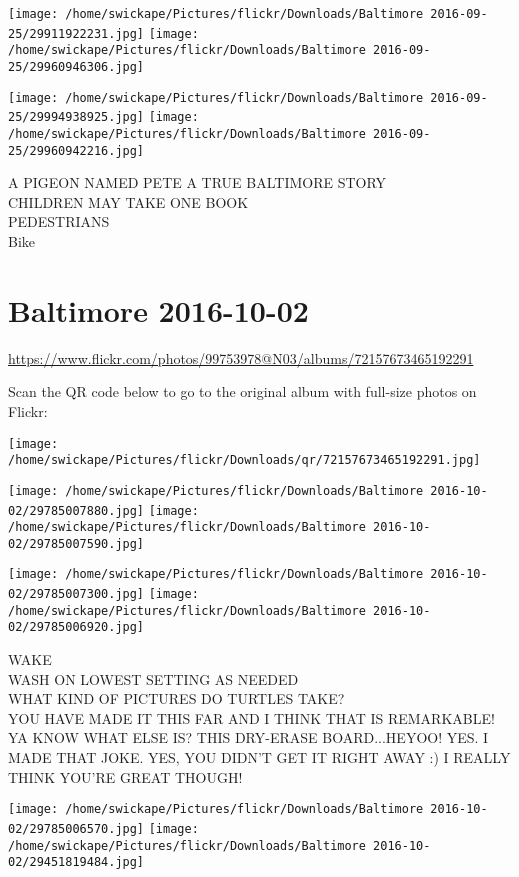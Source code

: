 \documentclass[10pt,letterpaper]{article}
\begin{document}
\texttt{[image: /home/swickape/Pictures/flickr/Downloads/Baltimore 2016-09-25/29911922231.jpg]}
\texttt{[image: /home/swickape/Pictures/flickr/Downloads/Baltimore 2016-09-25/29960946306.jpg]}

\texttt{[image: /home/swickape/Pictures/flickr/Downloads/Baltimore 2016-09-25/29994938925.jpg]}
\texttt{[image: /home/swickape/Pictures/flickr/Downloads/Baltimore 2016-09-25/29960942216.jpg]}

A PIGEON NAMED PETE A TRUE BALTIMORE STORY\\
CHILDREN MAY TAKE ONE BOOK\\
PEDESTRIANS\\
Bike
\pagebreak

\section*{Baltimore 2016-10-02}

\url{https://www.flickr.com/photos/99753978@N03/albums/72157673465192291}

Scan the QR code below to go to the original album with full-size photos on Flickr:

\texttt{[image: /home/swickape/Pictures/flickr/Downloads/qr/72157673465192291.jpg]}
\pagebreak

\texttt{[image: /home/swickape/Pictures/flickr/Downloads/Baltimore 2016-10-02/29785007880.jpg]}
\texttt{[image: /home/swickape/Pictures/flickr/Downloads/Baltimore 2016-10-02/29785007590.jpg]}

\texttt{[image: /home/swickape/Pictures/flickr/Downloads/Baltimore 2016-10-02/29785007300.jpg]}
\texttt{[image: /home/swickape/Pictures/flickr/Downloads/Baltimore 2016-10-02/29785006920.jpg]}

WAKE\\
WASH ON LOWEST SETTING AS NEEDED\\
WHAT KIND OF PICTURES DO TURTLES TAKE?\\
YOU HAVE MADE IT THIS FAR AND I THINK THAT IS REMARKABLE!  YA KNOW WHAT ELSE IS?  THIS DRY{-}ERASE BOARD...HEYOO! YES.  I MADE THAT JOKE.  YES, YOU DIDN'T GET IT RIGHT AWAY :) I REALLY THINK YOU'RE GREAT THOUGH!
\pagebreak

\texttt{[image: /home/swickape/Pictures/flickr/Downloads/Baltimore 2016-10-02/29785006570.jpg]}
\texttt{[image: /home/swickape/Pictures/flickr/Downloads/Baltimore 2016-10-02/29451819484.jpg]}
\end{document}
